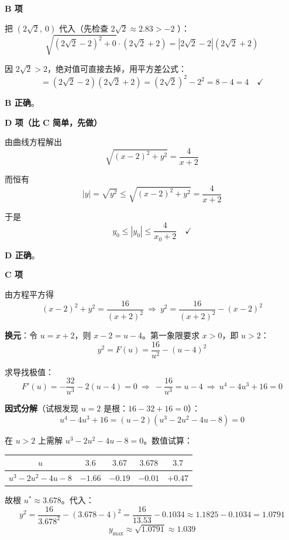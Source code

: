 \par\medskip

\textbf{B 项}

把 $\left(2\sqrt2,\ 0\right)$ 代入（先检查 $2\sqrt2\approx2.83>-2$ ）：
\[\sqrt{\left(2\sqrt2-2\right)^{2}+0}\cdot\left(2\sqrt2+2\right)=\left|2\sqrt2-2\right|\left(2\sqrt2+2\right)\]

因 $2\sqrt2>2$，绝对值可直接去掉，用平方差公式：
\[=\left(2\sqrt2-2\right)\left(2\sqrt2+2\right)=\left(2\sqrt2\right)^{2}-2^{2}=8-4=4\quad\checkmark\]

 \textbf{B 正确}。

\par\medskip

\textbf{D 项（比 C 简单，先做）}

由曲线方程解出
\[\sqrt{(x-2)^{2}+y^{2}}=\frac{4}{x+2}\]

而恒有
\[|y|=\sqrt{y^{2}}\le\sqrt{(x-2)^{2}+y^{2}}=\frac{4}{x+2}\]

于是
\[y_0\le\left|y_0\right|\le\frac{4}{x_0+2}\quad\checkmark\]

 \textbf{D 正确}。

\par\medskip

\textbf{C 项}

由方程平方得
\[(x-2)^{2}+y^{2}=\frac{16}{(x+2)^{2}}\ \Longrightarrow\ y^{2}=\frac{16}{(x+2)^{2}}-(x-2)^{2}\]

\textbf{换元}：令 $u=x+2$，则 $x-2=u-4$。第一象限要求 $x>0$，即 $u>2$：
\[y^{2}=F(u)=\frac{16}{u^{2}}-(u-4)^{2}\]

求导找极值：
\[F'(u)=-\frac{32}{u^{3}}-2(u-4)=0\ \Longrightarrow\ -\frac{16}{u^{3}}=u-4\ \Longrightarrow\ u^{4}-4u^{3}+16=0\]

\textbf{因式分解}（试根发现 $u=2$ 是根：$16-32+16=0$）：
\[u^{4}-4u^{3}+16=(u-2)\left(u^{3}-2u^{2}-4u-8\right)=0\]

在 $u>2$ 上需解 $u^{3}-2u^{2}-4u-8=0$。数值试算：

\begin{center}
\begin{tabular}{ccccc}
\toprule
$u$ & $3.6$ & $3.67$ & $3.678$ & $3.7$ \\
\midrule
$u^3-2u^2-4u-8$ & $-1.66$ & $-0.19$ & $-0.01$ & $+0.47$ \\
\bottomrule
\end{tabular}
\end{center}

故根 $u^{*}\approx3.678$。代入：
\[y^{2}=\frac{16}{3.678^{2}}-(3.678-4)^{2}=\frac{16}{13.53}-0.1034\approx1.1825-0.1034=1.0791\]
\[y_{\max}\approx\sqrt{1.0791}\approx1.039\]


